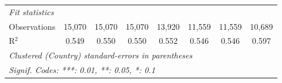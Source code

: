 \begin{tabular}{lccccccc}
   \midrule \emph{Fit statistics}\\
   Observations                                                       & 15,070         & 15,070        & 15,070        & 13,920        & 11,559         & 11,559         & 10,689\\  
   R$^2$                                                              & 0.549          & 0.550         & 0.550         & 0.552         & 0.546          & 0.546          & 0.597\\  
   \midrule
   \multicolumn{8}{l}{\emph{Clustered (Country) standard-errors in parentheses}}\\
   \multicolumn{8}{l}{\emph{Signif. Codes: ***: 0.01, **: 0.05, *: 0.1}}\\
\end{tabular}
\par\endgroup


